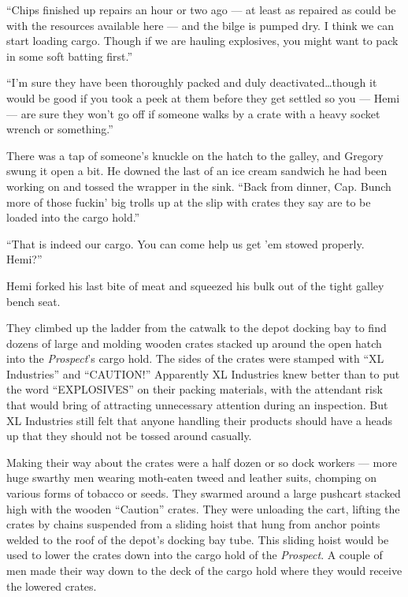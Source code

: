\documentclass[
]{scrbook}
\begin{document}
``Chips finished up repairs an hour or two ago --- at least as repaired
as could be with the resources available here --- and the bilge is
pumped dry. I think we can start loading cargo. Though if we are hauling
explosives, you might want to pack in some soft batting first.''

``I'm sure they have been thoroughly packed and duly
deactivated\ldots though it would be good if you took a peek at them
before they get settled so you --- Hemi --- are sure they won't go off
if someone walks by a crate with a heavy socket wrench or something.''

There was a tap of someone's knuckle on the hatch to the galley, and
Gregory swung it open a bit. He downed the last of an ice cream sandwich
he had been working on and tossed the wrapper in the sink. ``Back from
dinner, Cap. Bunch more of those fuckin' big trolls up at the slip with
crates they say are to be loaded into the cargo hold.''

``That is indeed our cargo. You can come help us get 'em stowed
properly. Hemi?''

Hemi forked his last bite of meat and squeezed his bulk out of the tight
galley bench seat.

\bigskip

They climbed up the ladder from the catwalk to the depot docking bay to
find dozens of large and molding wooden crates stacked up around the
open hatch into the \emph{Prospect}'s cargo hold. The sides of the
crates were stamped with ``XL Industries'' and ``CAUTION!'' Apparently
XL Industries knew better than to put the word ``EXPLOSIVES'' on their
packing materials, with the attendant risk that would bring of
attracting unnecessary attention during an inspection. But XL Industries
still felt that anyone handling their products should have a heads up
that they should not be tossed around casually.

Making their way about the crates were a half dozen or so dock workers
--- more huge swarthy men wearing moth-eaten tweed and leather suits,
chomping on various forms of tobacco or seeds. They swarmed around a
large pushcart stacked high with the wooden ``Caution'' crates. They
were unloading the cart, lifting the crates by chains suspended from a
sliding hoist that hung from anchor points welded to the roof of the
depot's docking bay tube. This sliding hoist would be used to lower the
crates down into the cargo hold of the \emph{Prospect}. A couple of men
made their way down to the deck of the cargo hold where they would
receive the lowered crates.
\end{document}
